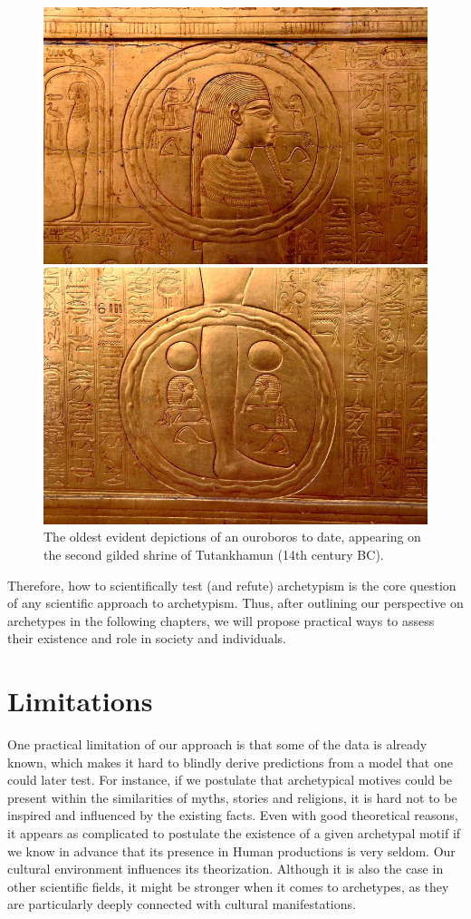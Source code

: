 \documentclass[
]{book}
\begin{document}
\begin{figure}

{\centering \includegraphics[width=0.49\linewidth]{img/ouroboros_tutankhumon} 

}

\caption{The oldest evident depictions of an ouroboros to date, appearing on the second gilded shrine of Tutankhamun (14th century BC).}\label{fig:unnamed-chunk-13}
\end{figure}

Therefore, how to scientifically test (and refute) archetypism is the core question of any scientific approach to archetypism. Thus, after outlining our perspective on archetypes in the following chapters, we will propose practical ways to assess their existence and role in society and individuals.

\hypertarget{limitations}{%
\section{Limitations}\label{limitations}}

One practical limitation of our approach is that some of the data is already known, which makes it hard to blindly derive predictions from a model that one could later test. For instance, if we postulate that archetypical motives could be present within the similarities of myths, stories and religions, it is hard not to be inspired and influenced by the existing facts. Even with good theoretical reasons, it appears as complicated to postulate the existence of a given archetypal motif if we know in advance that its presence in Human productions is very seldom. Our cultural environment influences its theorization. Although it is also the case in other scientific fields, it might be stronger when it comes to archetypes, as they are particularly deeply connected with cultural manifestations.
\end{document}
